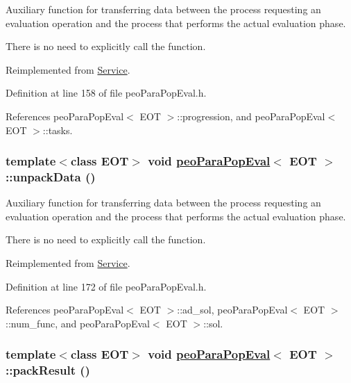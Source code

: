 Auxiliary function for transferring data between the process requesting an evaluation operation and the process that performs the actual evaluation phase. 

There is no need to explicitly call the function. 

Reimplemented from \hyperlink{classService_aea4b8f7f8fb88e83862ee4bfd9ab207}{Service}.

Definition at line 158 of file peo\-Para\-Pop\-Eval.h.

References peo\-Para\-Pop\-Eval$<$ EOT $>$::progression, and peo\-Para\-Pop\-Eval$<$ EOT $>$::tasks.\hypertarget{classpeoParaPopEval_410bf4c173e2f36df82251cb16ce1b05}{
\subsubsection[unpackData]{\setlength{\rightskip}{0pt plus 5cm}template$<$class EOT$>$ void \hyperlink{classpeoParaPopEval}{peo\-Para\-Pop\-Eval}$<$ EOT $>$::unpack\-Data ()}}
\label{classpeoParaPopEval_410bf4c173e2f36df82251cb16ce1b05}


Auxiliary function for transferring data between the process requesting an evaluation operation and the process that performs the actual evaluation phase. 

There is no need to explicitly call the function. 

Reimplemented from \hyperlink{classService_3bd87b444710813d30fd754d4d0b4df3}{Service}.

Definition at line 172 of file peo\-Para\-Pop\-Eval.h.

References peo\-Para\-Pop\-Eval$<$ EOT $>$::ad\_\-sol, peo\-Para\-Pop\-Eval$<$ EOT $>$::num\_\-func, and peo\-Para\-Pop\-Eval$<$ EOT $>$::sol.\hypertarget{classpeoParaPopEval_24bb4ae84b0b9f64e7170e3d2b0e1223}{
\subsubsection[packResult]{\setlength{\rightskip}{0pt plus 5cm}template$<$class EOT$>$ void \hyperlink{classpeoParaPopEval}{peo\-Para\-Pop\-Eval}$<$ EOT $>$::pack\-Result ()}}
\label{classpeoParaPopEval_24bb4ae84b0b9f64e7170e3d2b0e1223}


